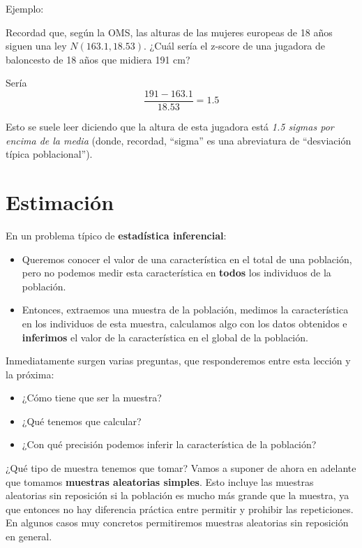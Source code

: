 \documentclass[
  spanish,
  letterpaper,
  DIV=11,
  numbers=noendperiod]{scrreprt}
\providecommand{\tightlist}{%
  \setlength{\itemsep}{0pt}\setlength{\parskip}{0pt}}
\begin{document}
Ejemplo:

Recordad que, según la OMS, las alturas de las mujeres europeas de 18
años siguen una ley \(N(163.1,18.53)\). ¿Cuál sería el z-score de una
jugadora de baloncesto de 18 años que midiera 191 cm?

Sería \[ 
\frac{191-163.1}{18.53}=1.5
\]

Esto se suele leer diciendo que la altura de esta jugadora está
\emph{1.5 sigmas por encima de la media} (donde, recordad, ``sigma'' es
una abreviatura de ``desviación típica poblacional'').


\chapter{Estimación}\label{estimaciuxf3n}

En un problema típico de \textbf{estadística inferencial}:

\begin{itemize}
\item
  Queremos conocer el valor de una característica en el total de una
  población, pero no podemos medir esta característica en \textbf{todos}
  los individuos de la población.
\item
  Entonces, extraemos una muestra de la población, medimos la
  característica en los individuos de esta muestra, calculamos algo con
  los datos obtenidos e \textbf{inferimos} el valor de la característica
  en el global de la población.
\end{itemize}

Inmediatamente surgen varias preguntas, que responderemos entre esta
lección y la próxima:

\begin{itemize}
\tightlist
\item
  ¿Cómo tiene que ser la muestra?
\item
  ¿Qué tenemos que calcular?
\item
  ¿Con qué precisión podemos inferir la característica de la población?
\end{itemize}

¿Qué tipo de muestra tenemos que tomar? Vamos a suponer de ahora en
adelante que tomamos \textbf{muestras aleatorias simples}. Esto incluye
las muestras aleatorias sin reposición si la población es mucho más
grande que la muestra, ya que entonces no hay diferencia práctica entre
permitir y prohibir las repeticiones. En algunos casos muy concretos
permitiremos muestras aleatorias sin reposición en general.
\end{document}
